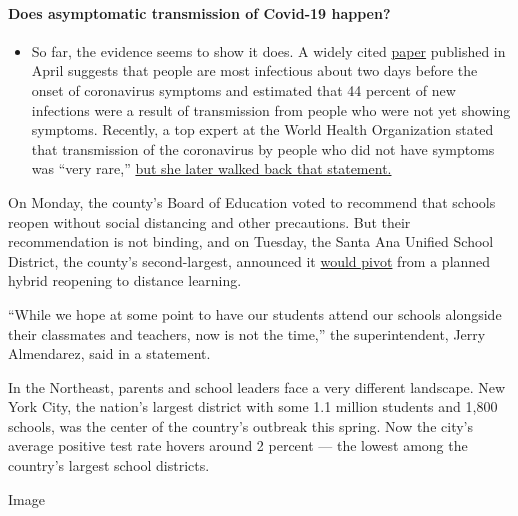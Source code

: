 \begin{itemize}
{  \paragraph{Does asymptomatic transmission of Covid-19
  happen?}\label{does-asymptomatic-transmission-of-covid-19-happen}}

  \begin{itemize}
  \tightlist
  \item
    So far, the evidence seems to show it does. A widely cited
    \href{https://www.nature.com/articles/s41591-020-0869-5}{paper}
    published in April suggests that people are most infectious about
    two days before the onset of coronavirus symptoms and estimated that
    44 percent of new infections were a result of transmission from
    people who were not yet showing symptoms. Recently, a top expert at
    the World Health Organization stated that transmission of the
    coronavirus by people who did not have symptoms was ``very rare,''
    \href{https://www.nytimes.com/2020/06/09/world/coronavirus-updates.html?action=click\&pgtype=Article\&state=default\&region=MAIN_CONTENT_3\&context=storylines_faq\#link-1f302e21}{but
    she later walked back that statement.}
  \end{itemize}
\end{itemize}

On Monday, the county's Board of Education voted to recommend that
schools reopen without social distancing and other precautions. But
their recommendation is not binding, and on Tuesday, the Santa Ana
Unified School District, the county's second-largest, announced it
\href{https://www.sausd.us/site/default.aspx?PageType=3\&DomainID=1\&ModuleInstanceID=6157\&ViewID=6446EE88-D30C-497E-9316-3F8874B3E108\&RenderLoc=0\&FlexDataID=96385\&PageID=1}{would
pivot} from a planned hybrid reopening to distance learning.

``While we hope at some point to have our students attend our schools
alongside their classmates and teachers, now is not the time,'' the
superintendent, Jerry Almendarez, said in a statement.

In the Northeast, parents and school leaders face a very different
landscape. New York City, the nation's largest district with some 1.1
million students and 1,800 schools, was the center of the country's
outbreak this spring. Now the city's average positive test rate hovers
around 2 percent --- the lowest among the country's largest school
districts.

Image

